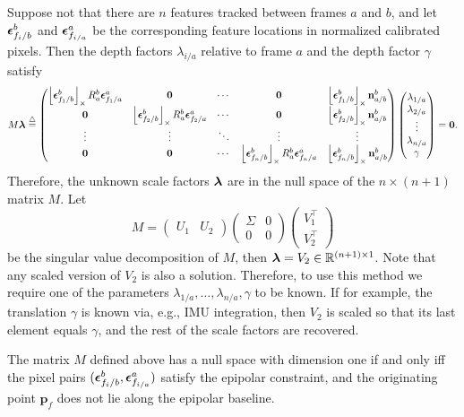 	Suppose not that there are $n$ features tracked between frames $a$ and $b$, and let $\boldsymbol{\epsilon}_{f_i/b}^b$ and $\boldsymbol{\epsilon}_{f_{i/a}}^a$ be the corresponding feature locations in normalized calibrated pixels.  Then the depth factors $\lambda_{i/a}$ relative to frame $a$ and the depth factor $\gamma$ satisfy
	\[
	M\boldsymbol{\lambda} \stackrel{\triangle}{=} \begin{pmatrix}
 					  	\left\lfloor\boldsymbol{\epsilon}_{f_1/b}^b\right\rfloor_{\times} R_a^b \boldsymbol{\epsilon}_{f_1/a}^a & \mathbf{0} & \cdots & \mathbf{0} & \left\lfloor\boldsymbol{\epsilon}_{f_1/b}^b\right\rfloor_{\times} \mathbf{n}_{a/b}^b \\
 					  	\mathbf{0} & \left\lfloor\boldsymbol{\epsilon}_{f_2/b}^b\right\rfloor_{\times} R_a^b \boldsymbol{\epsilon}_{f_2/a}^a & \cdots & \mathbf{0} & \left\lfloor\boldsymbol{\epsilon}_{f_2/b}^b\right\rfloor_{\times} \mathbf{n}_{a/b}^b \\
 					  	\vdots & \vdots & \ddots & \vdots & \vdots \\
 					  	\mathbf{0} & \mathbf{0} & \cdots & \left\lfloor\boldsymbol{\epsilon}_{f_n/b}^b\right\rfloor_{\times} R_a^b \boldsymbol{\epsilon}_{f_n/a}^a & \left\lfloor\boldsymbol{\epsilon}_{f_n/b}^b\right\rfloor_{\times} \mathbf{n}_{a/b}^b
 					  \end{pmatrix}
 					  \begin{pmatrix} \lambda_{1/a} \\ \lambda_{2/a} \\ \vdots \\ \lambda_{n/a} \\ \gamma \end{pmatrix} = \mathbf{0}.
	\]
	Therefore, the unknown scale factors $\boldsymbol{\lambda}$ are in the null space of the $n\times(n+1)$ matrix $M$.  Let
	\[
		M = \begin{pmatrix}U_1 & U_2 \end{pmatrix}\begin{pmatrix}\Sigma & 0 \\ 0 & 0 \end{pmatrix} \begin{pmatrix} V_1^\top \\ V_2^\top \end{pmatrix}
	\]
	be the singular value decomposition of $M$, then $\boldsymbol{\lambda} = V_2\in\mathbb{R}^{(n+1)\times 1}$.  Note that any scaled version of $V_2$ is also a solution.  Therefore, to use this method we require one of the parameters $\lambda_{1/a}, \dots, \lambda_{n/a}, \gamma$ to be known.  If for example, the translation $\gamma$ is known via, e.g., IMU integration, then $V_2$ is scaled so that its last element equals $\gamma$, and the rest of the scale factors are recovered.
		
	\begin{theorem}
		The matrix $M$ defined above has a null space with dimension one if and only iff the pixel pairs $(\boldsymbol{\epsilon}_{f_i/b}^b, \boldsymbol{\epsilon}_{f_{i/a}}^a)$ satisfy the epipolar constraint, and the originating point $\mathbf{p}_f$ does not lie along the epipolar baseline.
	\end{theorem}
	
